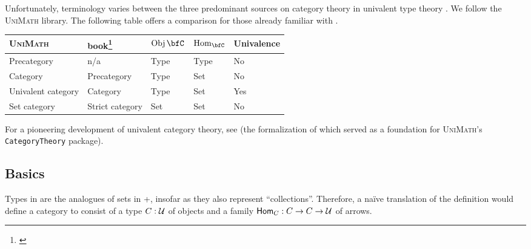 \documentclass[a5paper]{article}
\newcommand*{\software}[1]{{\textsc{#1}}\index{#1}}
\newcommand*{\UniMath}{\software{UniMath}}
\begin{document}
Unfortunately, terminology varies between the three predominant sources on
category theory in univalent type theory \cite{book} \cite{unimath}
\cite{hott-lib}. We follow the \UniMath{} library. The
following table offers a comparison for those already familiar with \cite{book}.
\begin{center}
  \begin{tabular}{| l | l | l | l | l |}
    \hline
    \UniMath{} & \HoTT{} book\footnote{\cite{book}} & $\Obj\bfC$ & $\Hom_{\bfC}$ & Univalence \\ \hline
    Precategory                  & n/a             & Type & Type  & No \\
    Category                     & Precategory     & Type & Set   & No \\
    Univalent category           & Category        & Type & Set   & Yes \\
    Set category                 & Strict category & Set  & Set   & No \\
    \hline
  \end{tabular}
\end{center}
For a pioneering development of univalent category theory, see \cite{rezk} (the
formalization of which served as a foundation for \UniMath{}'s
\texttt{CategoryTheory} package). 

\subsection{Basics}
\label{subsec:basics}

Types in \UTT{} are the analogues of sets in \ZFC{}+\FOL{}, insofar as they also
represent ``collections''. Therefore, a naïve translation of the definition
would define a category to consist of a type $C:\mathcal{U}$ of objects and a
family $\mathsf{Hom}_{C}:C\to C\to \mathcal{U}$ of arrows.
\end{document}
